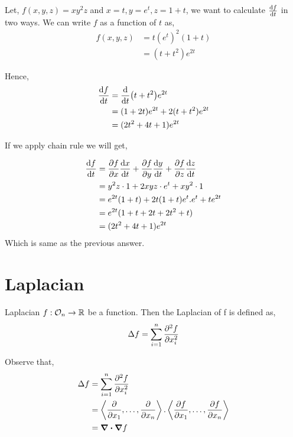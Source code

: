 \documentclass[../Analysis-3.tex]{subfiles}
\begin{document}
\begin{Eg}{}{}
    Let, $f(x,y,z) = xy^{2}z$ and $x=t, y=e^t, z= 1+t$, we want to calculate $\dv{f}{t}$ in two ways. We can write $f$ as a function of $t$ as,
    \begin{align*}
        f(x,y,z)
         & = t(e^t)^2(1+t) \\
         & = (t+t^2)e^{2t}
    \end{align*}

    Hence, \begin{align*}
        \dv{f}{t}
         & = \dv{t}(t+t^2)e^{2t}           \\
         & = (1+2t)e^{2t} + 2(t+t^2)e^{2t} \\
         & = (2t^2+4t+1)e^{2t}
    \end{align*}

    If we apply chain rule we will get,

    \begin{align*}
        \dv{f}{t}
         & = \pdv{f}{x} \dv{x}{t} + \pdv{f}{y} \dv{y}{t} + \pdv{f}{z} \dv{z}{t} \\
         & = y^2z\cdot 1 + 2xyz\cdot e^t + xy^2\cdot 1                          \\
         & = e^{2t}(1+t) + 2t(1+t)e^t.e^t + te^{2t}                             \\
         & = e^{2t}(1+t+2t+2t^2+t)                                              \\
         & = (2t^2+4t+1)e^{2t}
    \end{align*}
    Which is same as the previous answer.
\end{Eg}


\section{Laplacian}

\begin{Def}{Laplacian}{}
    $f : \mathcal{O}_{n} \to \mathbb{R}$ be a function. Then the Laplacian of f is defined as, \[ \Delta f = \sum_{i = 1}^{n} \pdv[2]{f}{x_i}   \]
\end{Def}

Observe that,  \begin{align*}
    \Delta f
     & = \sum_{i=1}^{n} \pdv[2]{f}{x_i}                                                                                               \\
     & = \left\langle \pdv{}{x_1}, \ldots, \pdv{}{x_n}  \right\rangle. \left\langle \pdv{f}{x_1}, \ldots, \pdv{f}{x_n}  \right\rangle \\
     & = \div\grad f
\end{align*}
\end{document}
